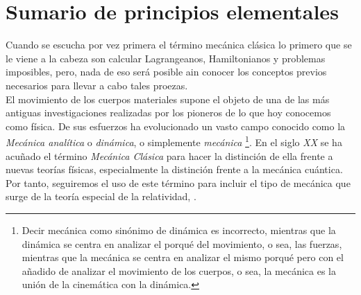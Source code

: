 \documentclass[../main.tex]{subfiles}
\begin{document}
\vspace{3cm}
\chapter{Sumario de principios elementales}
Cuando se escucha por vez primera el término mecánica clásica lo primero que se le viene a la cabeza son calcular Lagrangeanos, Hamiltonianos y problemas imposibles, pero, nada de eso será posible ain conocer los conceptos previos necesarios para llevar a cabo tales proezas. \\

El movimiento de los cuerpos materiales supone el objeto de una de las más antiguas investigaciones realizadas por los pioneros de lo que hoy conocemos como física. De sus esfuerzos ha evolucionado un vasto campo conocido como la \emph{Mecánica analítica} o \emph{dinámica}, o simplemente \emph{mecánica} \footnote{Decir mecánica como sinónimo de dinámica es incorrecto, mientras que la dinámica se centra en analizar el porqué del movimiento, o sea, las fuerzas, mientras que la mecánica se centra en analizar el mismo porqué pero con el añadido de analizar el movimiento de los cuerpos, o sea, la mecánica es la unión de la cinemática con la dinámica.}. En el siglo \textit{XX} se ha acuñado el término \emph{Mecánica Clásica} para hacer la distinción de ella frente a nuevas teorías físicas, especialmente la distinción frente a la mecánica cuántica. Por tanto, seguiremos el uso de este término para incluir el tipo de mecánica que surge de la teoría especial de la relatividad, \cite{goldstein2002classical}.
\end{document}
